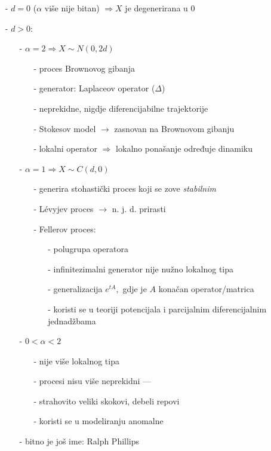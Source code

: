 \documentclass{article}
\begin{document}
\begin{enumerate}
    \item[-] \(d=0\) (\(\alpha\) više nije bitan) \(\Rightarrow X\) je degenerirana u \(0\)
    \item[-] \(d>0\):
    \begin{enumerate}
        \item[-] \(\alpha=2\Rightarrow X\sim N(0,2d)\)
        \begin{enumerate}
            \item[-] proces Brownovog gibanja
            \item[-] generator: Laplaceov operator (\(\Delta\))
            \item[-] neprekidne, nigdje diferencijabilne trajektorije
            \item[-] Stokesov model \(\to\) zasnovan na Brownovom gibanju
            \item[-] lokalni operator \(\Rightarrow\) lokalno ponašanje određuje dinamiku
        \end{enumerate}
        \item[-] \(\alpha=1\Rightarrow X\sim C(d,0)\)
        \begin{enumerate}
            \item[-] generira stohastički proces koji se zove \emph{stabilnim}
            \item[-] L\'evyjev proces \(\to\) n. j. d. prirasti
            \item[-] Fellerov proces:
            \begin{itemize}
                \item[-] polugrupa operatora
                \item[-] infinitezimalni generator nije nužno lokalnog tipa
                \item[-] generalizacija \(e^{tA},\) gdje je \(A\) konačan operator/matrica
                \item[-] koristi se u teoriji potencijala i parcijalnim diferencijalnim jednadžbama
            \end{itemize}
        \end{enumerate}
        \item[-] \(0<\alpha<2\)
        \begin{enumerate}
            \item[-] nije više lokalnog tipa
            \item[-] procesi nisu više neprekidni — \item[-] strahovito veliki skokovi, debeli repovi
            \item[-] koristi se u modeliranju anomalne  \end{enumerate}
        \item[-] bitno je još ime: Ralph Phillips
    \end{enumerate} 
\end{enumerate}
\end{document}
